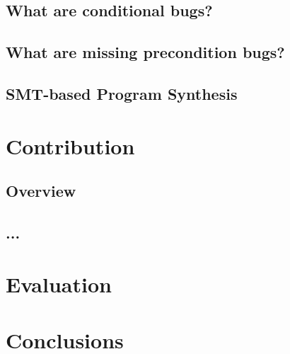 \documentclass[a4paper,10pt,twocolumn]{article}
\begin{document}
\subsection{What are conditional bugs?}

\subsection{What are missing precondition bugs?}

\subsection{SMT-based Program Synthesis}


\section{Contribution}

\subsection{Overview}


\label{flow_graph}

\subsection{...}

\section{Evaluation}
\label{evaluation}

\section{Conclusions}
\label{conclusions}


% 
\end{document}
